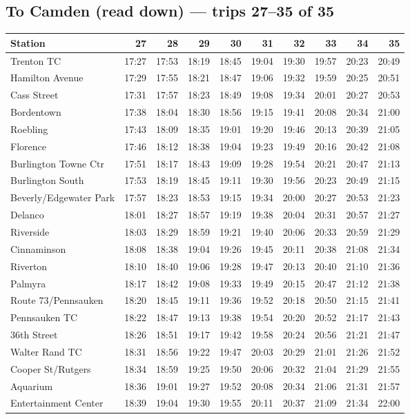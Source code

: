 \subsection*{To Camden (read down) --- trips 27--35 of 35}
\begin{center}\footnotesize\setlength{\tabcolsep}{3pt}\begin{tabular}{@{}lrrrrrrrrr@{}}\toprule
Station & 27 & 28 & 29 & 30 & 31 & 32 & 33 & 34 & 35 \\\midrule
Trenton TC & 17:27 & 17:53 & 18:19 & 18:45 & 19:04 & 19:30 & 19:57 & 20:23 & 20:49 \\
Hamilton Avenue & 17:29 & 17:55 & 18:21 & 18:47 & 19:06 & 19:32 & 19:59 & 20:25 & 20:51 \\
Cass Street & 17:31 & 17:57 & 18:23 & 18:49 & 19:08 & 19:34 & 20:01 & 20:27 & 20:53 \\
Bordentown & 17:38 & 18:04 & 18:30 & 18:56 & 19:15 & 19:41 & 20:08 & 20:34 & 21:00 \\
Roebling & 17:43 & 18:09 & 18:35 & 19:01 & 19:20 & 19:46 & 20:13 & 20:39 & 21:05 \\
Florence & 17:46 & 18:12 & 18:38 & 19:04 & 19:23 & 19:49 & 20:16 & 20:42 & 21:08 \\
Burlington Towne Ctr & 17:51 & 18:17 & 18:43 & 19:09 & 19:28 & 19:54 & 20:21 & 20:47 & 21:13 \\
Burlington South & 17:53 & 18:19 & 18:45 & 19:11 & 19:30 & 19:56 & 20:23 & 20:49 & 21:15 \\
Beverly/Edgewater Park & 17:57 & 18:23 & 18:53 & 19:15 & 19:34 & 20:00 & 20:27 & 20:53 & 21:23 \\
Delanco & 18:01 & 18:27 & 18:57 & 19:19 & 19:38 & 20:04 & 20:31 & 20:57 & 21:27 \\
Riverside & 18:03 & 18:29 & 18:59 & 19:21 & 19:40 & 20:06 & 20:33 & 20:59 & 21:29 \\
Cinnaminson & 18:08 & 18:38 & 19:04 & 19:26 & 19:45 & 20:11 & 20:38 & 21:08 & 21:34 \\
Riverton & 18:10 & 18:40 & 19:06 & 19:28 & 19:47 & 20:13 & 20:40 & 21:10 & 21:36 \\
Palmyra & 18:17 & 18:42 & 19:08 & 19:33 & 19:49 & 20:15 & 20:47 & 21:12 & 21:38 \\
Route 73/Pennsauken & 18:20 & 18:45 & 19:11 & 19:36 & 19:52 & 20:18 & 20:50 & 21:15 & 21:41 \\
Pennsauken TC & 18:22 & 18:47 & 19:13 & 19:38 & 19:54 & 20:20 & 20:52 & 21:17 & 21:43 \\
36th Street & 18:26 & 18:51 & 19:17 & 19:42 & 19:58 & 20:24 & 20:56 & 21:21 & 21:47 \\
Walter Rand TC & 18:31 & 18:56 & 19:22 & 19:47 & 20:03 & 20:29 & 21:01 & 21:26 & 21:52 \\
Cooper St/Rutgers & 18:34 & 18:59 & 19:25 & 19:50 & 20:06 & 20:32 & 21:04 & 21:29 & 21:55 \\
Aquarium & 18:36 & 19:01 & 19:27 & 19:52 & 20:08 & 20:34 & 21:06 & 21:31 & 21:57 \\
Entertainment Center & 18:39 & 19:04 & 19:30 & 19:55 & 20:11 & 20:37 & 21:09 & 21:34 & 22:00 \\
\bottomrule\end{tabular}\end{center}
\clearpage
